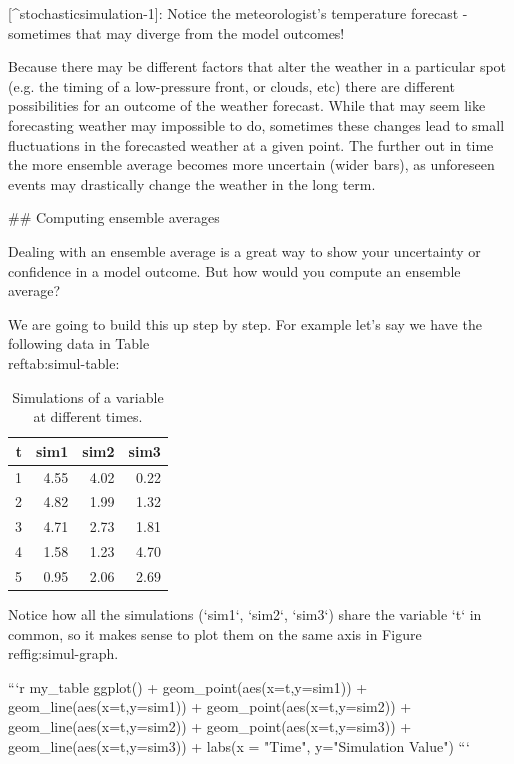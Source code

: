 \documentclass[
]{book}
\theoremstyle{definition}
\theoremstyle{definition}
\theoremstyle{definition}
\theoremstyle{remark}
\begin{document}
[^stochasticsimulation-1]: Notice the meteorologist's temperature forecast - sometimes that may diverge from the model outcomes!

Because there may be different factors that alter the weather in a particular spot (e.g. the timing of a low-pressure front, or clouds, etc) there are different possibilities for an outcome of the weather forecast. While that may seem like forecasting weather may impossible to do, sometimes these changes lead to small fluctuations in the forecasted weather at a given point. The further out in time the more ensemble average becomes more uncertain (wider bars), as unforeseen events may drastically change the weather in the long term.

## Computing ensemble averages

Dealing with an ensemble average is a great way to show your uncertainty or confidence in a model outcome. But how would you compute an ensemble average?

We are going to build this up step by step. For example let's say we have the following data in Table \\ref{tab:simul-table}:

\begin{table}

\caption{\label{tab:simul-table}Simulations of a variable at different times.}
\centering
\begin{tabular}[t]{r|r|r|r}
\hline
t & sim1 & sim2 & sim3\\
\hline
1 & 4.55 & 4.02 & 0.22\\
\hline
2 & 4.82 & 1.99 & 1.32\\
\hline
3 & 4.71 & 2.73 & 1.81\\
\hline
4 & 1.58 & 1.23 & 4.70\\
\hline
5 & 0.95 & 2.06 & 2.69\\
\hline
\end{tabular}
\end{table}

Notice how all the simulations (`sim1`, `sim2`, `sim3`) share the variable `t` in common, so it makes sense to plot them on the same axis in Figure \\ref{fig:simul-graph}. 


```r
my_table %
  ggplot() +
  geom_point(aes(x=t,y=sim1)) +
  geom_line(aes(x=t,y=sim1)) +
  geom_point(aes(x=t,y=sim2)) +
  geom_line(aes(x=t,y=sim2)) +
  geom_point(aes(x=t,y=sim3)) +
  geom_line(aes(x=t,y=sim3)) +
  labs(x = "Time", y="Simulation Value")
```
\end{document}
